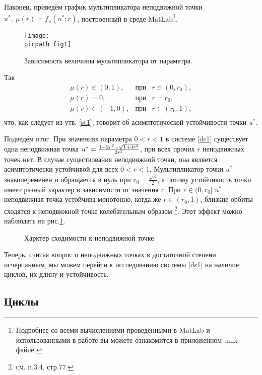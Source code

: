 \documentclass[oneside,final,12pt]{article}
\newcommand*\inter[2]{(#1,#2)}
\newcommand*\picsize{0.5\textwidth}
\newcommand*\subpicsize{0.45\textwidth}
\newcommand*\picpath{pictures/}
\theoremstyle{plain}
\theoremstyle{remark}
\theoremstyle{definition}
\theoremstyle{plain}
\begin{document}
		Наконец, приведём график мультипликатора неподвижной точки \(u^*,\: \mu(r) = f_u(u^*;r) \), построенный в среде MatLab\footnote{Подробнее со всеми вычислениями проведёнными в MatLab и использованными в работе вы можете ознакомится в приложенном .mlx файле.}.
		\begin{figure}[h]
			\centering
			\texttt{[image: \\picpath fig1]}
			\caption{Зависимость величины мультипликатора от параметра.}
		\end{figure}

		Так
		 \[\begin{array}{lcl}
			\mu(r) \in \inter{0}{1}, &\text{при}& r \in \inter{0}{r_0},\\
			\mu(r) = 0, &\text{при}& r = r_0,\\
			\mu(r) \in \inter{-1}{0}, &\text{при}& r \in \inter{r_0}{1},\\
		\end{array}\]
		что, как следует из утв. \ref{st1}, говорит об асимптотической устойчивости точки \(u^*\).

		\bigskip
		Подведём итог. При значениях параметра \(0<r<1\) в системе \eqref{ds1} существует одна неподвижная точка \(u^* = \frac{1+2r^2 - \sqrt{1+4r^2}}{2r^2}\), при всех прочих \(r\)  неподвижных точек нет. В случае существования неподвижной точки, она является асимптотически устойчивой для всех \(0<r<1\). Мультипликатор точки \(u^*\) знакопеременен и обращается в нуль при \(r_0 = \frac{\sqrt{3}}{2} \), а потому устойчивость точки имеет разный характер в зависимости от значения \(r\). При \(r \in (0,r_0]\) \(u^*\) неподвижная точка устойчива монотонно, когда же \(r \in \inter{r_0}{1} \), близкие орбиты сходятся к неподвижной точке колебательным образом \footnote{см. \cite{DSMB} п.3.4, стр.77.}. Этот эффект можно наблюдать на рис.\ref{fig1}.

	\begin{figure}[!h]
		\centering
		\qquad
		\caption{Харктер сходимости к неподвижной точке.} \label{fig1}
	\end{figure}

	Теперь, считая вопрос о неподвижных точках в достаточной степени исчерпанным, мы можем перейти к исследованию системы \eqref{ds1} на наличие циклов, их длину и устойчивость.
		
	\subsection{Циклы}
\end{document}
